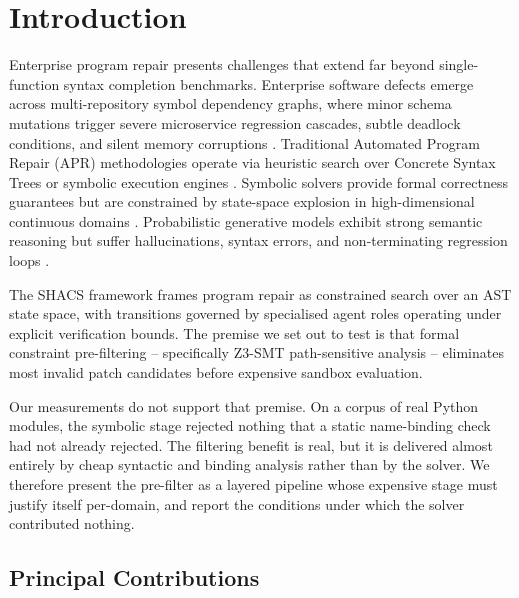 \documentclass[10pt,journal,compsoc,twocolumn]{IEEEtran}
\begin{document}
\section{Introduction}


Enterprise program repair presents challenges that extend far beyond single-function syntax completion benchmarks. Enterprise software defects emerge across multi-repository symbol dependency graphs, where minor schema mutations trigger severe microservice regression cascades, subtle deadlock conditions, and silent memory corruptions \cite{arxiv_2405_01543,arxiv_2203_02155}. Traditional Automated Program Repair (APR) methodologies operate via heuristic search over Concrete Syntax Trees or symbolic execution engines \cite{arxiv_2010_11146}. Symbolic solvers provide formal correctness guarantees but are constrained by state-space explosion in high-dimensional continuous domains \cite{arxiv_2404_01131}. Probabilistic generative models exhibit strong semantic reasoning but suffer hallucinations, syntax errors, and non-terminating regression loops \cite{arxiv_2005_14165}.

The SHACS framework frames program repair as constrained search over an AST state space, with transitions governed by specialised agent roles operating under explicit verification bounds. The premise we set out to test is that formal constraint pre-filtering -- specifically Z3-SMT path-sensitive analysis -- eliminates most invalid patch candidates before expensive sandbox evaluation.

Our measurements do not support that premise. On a corpus of real Python modules, the symbolic stage rejected nothing that a static name-binding check had not already rejected. The filtering benefit is real, but it is delivered almost entirely by cheap syntactic and binding analysis rather than by the solver. We therefore present the pre-filter as a layered pipeline whose expensive stage must justify itself per-domain, and report the conditions under which the solver contributed nothing.


\subsection{Principal Contributions}
\end{document}
